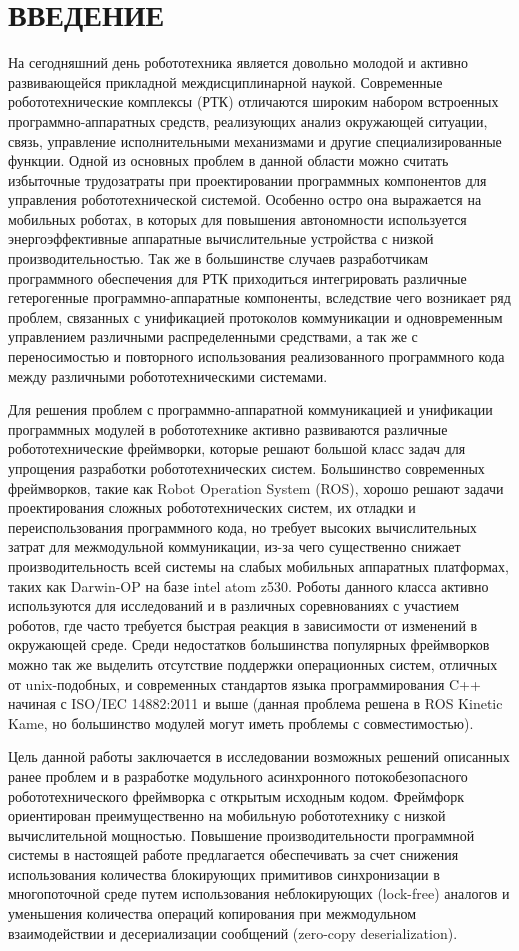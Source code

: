\chapter*{ВВЕДЕНИЕ}

На сегодняшний день робототехника является довольно молодой и активно 
развивающейся прикладной междисциплинарной наукой. Современные 
робототехнические комплексы (РТК) отличаются широким набором встроенных 
программно-аппаратных средств, реализующих анализ окружающей ситуации, связь, 
управление исполнительными механизмами и другие специализированные функции. 
Одной из основных проблем в данной области можно считать избыточные трудозатраты при проектировании программных компонентов для управления робототехнической системой. Особенно остро она выражается на мобильных роботах, в которых для повышения автономности используется энергоэффективные аппаратные вычислительные устройства с низкой производительностью. Так же в большинстве случаев разработчикам программного обеспечения для РТК приходиться интегрировать различные гетерогенные программно-аппаратные компоненты, вследствие чего возникает ряд проблем, связанных с унификацией протоколов коммуникации и одновременным управлением различными распределенными средствами, а так же с переносимостью и повторного использования реализованного программного кода между различными робототехническими системами.

Для решения проблем с программно-аппаратной коммуникацией и унификации 
программных модулей в робототехнике активно развиваются различные 
робототехнические фреймворки, которые решают большой класс задач для упрощения разработки робототехнических систем. Большинство современных фреймворков, такие как Robot Operation System (ROS), хорошо решают задачи проектирования сложных робототехнических систем, их отладки и переиспользования программного кода, но требует высоких вычислительных затрат для межмодульной коммуникации, из-за чего существенно снижает производительность всей системы на слабых мобильных аппаратных платформах, таких как Darwin-OP на базе intel atom z530. Роботы данного класса активно используются для исследований и в различных соревнованиях с участием роботов, где часто требуется быстрая реакция в зависимости от изменений в окружающей среде. Среди недостатков большинства популярных фреймворков можно так же выделить отсутствие поддержки операционных систем, отличных от unix-подобных, и современных стандартов языка программирования C++ начиная с ISO/IEC 14882:2011 и выше (данная проблема решена в ROS Kinetic Kame, но большинство модулей могут иметь проблемы с совместимостью).

Цель данной работы заключается в исследовании возможных решений описанных ранее проблем и в разработке модульного асинхронного потокобезопасного робототехнического фреймворка с открытым исходным кодом. Фреймфорк ориентирован преимущественно на мобильную робототехнику с низкой вычислительной мощностью. Повышение производительности программной системы в настоящей работе предлагается обеспечивать за счет снижения использования количества блокирующих примитивов синхронизации в многопоточной среде путем использования неблокирующих (lock-free) аналогов и уменьшения количества операций копирования при межмодульном взаимодействии и десериализации сообщений (zero-copy deserialization).
